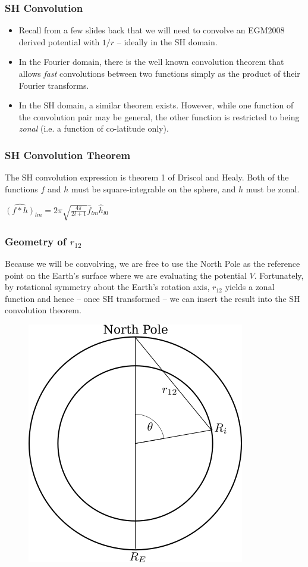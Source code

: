 \documentclass[aspectratio=43,mathserif]{beamer}
\begin{document}
\begin{frame}
\frametitle{SH Convolution}
\begin{itemize}

\item Recall from a few slides back that we will need to convolve an EGM2008 derived potential with \(1/r\) -- ideally in the SH domain. 

\item In the Fourier domain, there is the well known convolution theorem that allows \emph{fast} convolutions between two functions simply as the product of their Fourier transforms. 

\item In the SH domain, a similar theorem exists. However, while one function of the convolution pair may be general, the other function is restricted to being \emph{zonal} (i.e. a function of co-latitude only). 

\end{itemize}
\end{frame}

\begin{frame}
\frametitle{SH Convolution Theorem}
The SH convolution expression is theorem 1 of Driscol and Healy. Both of the functions \(f\) and \(h\) must be square-integrable on the sphere, and \(h\) must be zonal.
\begin{theorem}
\( \widehat{(f*h)}_{lm} = 2\pi \sqrt{\frac{4 \pi}{2l + 1}} \hat{f}_{lm} \hat{h}_{l0} \) 
\end{theorem}
\end{frame}

\begin{frame}
\frametitle{Geometry of \(r_{12}\)}
Because we will be convolving, we are free to  use the North Pole as the reference point on the Earth's surface where we are evaluating the potential \(V\). Fortunately, by rotational symmetry about the Earth's rotation axis, \(r_{12}\) yields a zonal function and hence -- once SH transformed -- we can insert the result into the SH convolution theorem.
\begin{figure}
\includegraphics[width=0.35\linewidth]{EarthGeometry.png}
\end{figure}
\end{frame}
\end{document}
